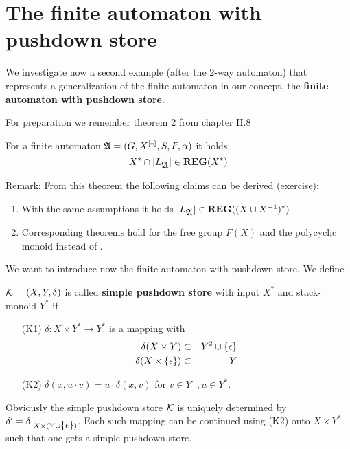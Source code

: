 \section{The finite automaton with pushdown store}

We investigate now a second example (after the 2-way automaton) that represents
a generalization of the finite automaton in our concept, the {\bf finite
automaton with pushdown store}.

For preparation we remember theorem 2 from chapter II.8

\begin{theorem}
For a finite automaton $\mbox{$\mathfrak{A}$} = (G, \mbox{${X}^{[*]}$}, S, F, \alpha)$ it holds:
\[ X^* \cap |L_{\mbox{$\mathfrak{A}$}}| \in \mbox{{\bf REG}}(X^*) \]
\end{theorem}

Remark: From this theorem the following claims can be derived (exercise):
\begin{enumerate}
  \item With the same assumptions it holds $|L_{\mbox{$\mathfrak{A}$}}| \in \mbox{{\bf REG}}((X\cup
  X^{-1})^*)$
  \item Corresponding theorems hold for the free group $F(X)$ and the polycyclic
  monoid  instead of .
\end{enumerate}
  
We want to introduce now the finite automaton with pushdown store. We define
\begin{definition}
$\mbox{$\mathcal{K}$} = (X, Y, \delta)$ is called {\bf simple pushdown store} with
input $X^*$ and stack-monoid $Y^*$ if
\begin{itemize}
  \item[(K1)] $\delta: X \times Y^* \to Y^*$ is a mapping with
  \begin{eqnarray*}
  \delta(X \times Y) & \subset & Y^2 \cup \mbox{$\{\epsilon\}$} \\
  \delta(X \times \mbox{$\{\epsilon\}$}) & \subset & Y
  \end{eqnarray*} 
  \item[(K2)] $\delta(x, u \cdot v) = u \cdot \delta(x, v)$ for $v \in Y^+,u \in
  Y^*$.
\end{itemize}
\end{definition} 

Obviously the simple pushdown store $\mbox{$\mathcal{K}$}$ is uniquely determined by
$\delta' = \delta |_{X \times (Y \cup \mbox{$\{\epsilon\}$})}$. Each such mapping
can be continued using (K2) onto $X \times Y^*$ such that one gets a simple
pushdown store.

